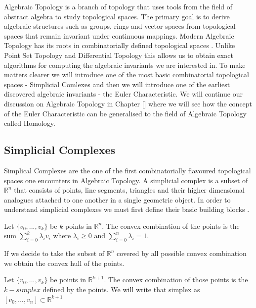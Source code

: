 Algebraic Topology is a branch of topology that uses tools from the field of abstract algebra to study topological spaces. The primary goal is to derive algebraic structures such as groups, rings and vector spaces from topological spaces that remain invariant under continuous mappings. Modern Algebraic Topology has its roots in combinatorially defined topological spaces \cite{comb-alg-topo}. Unlike Point Set Topology and Differential Topology this allows us to obtain exact algorithms for computing the algebraic invariants we are interested in. To make matters clearer we will introduce one of the most basic combinatorial topological spaces - Simplicial Comlexes and then we will introduce one of the earliest discovered algebraic invariants - the Euler Characteristic. We will continue our discussion on Algebraic Topology in Chapter [] where we will see how the concept of the Euler Characteristic can be generalised to the field of Algebraic Topology called Homology.

\subsection{Simplicial Complexes}

Simplical Complexes are the one of the first combinatorially flavoured topological spaces one encounters in Algebraic Topology. A simplicial complex is a subset of $\mathbb{R}^n$ that consists of points, line segments, triangles and their higher dimensional analogues attached to one another in a single geometric object. In order to understand simplicial complexes we must first define their basic building blocks \cite{comp-topo}.

\begin{defn} Let $\{v_0, ..., v_k\}$ be $k$ points in $\mathbb{R}^n$. The convex combination of the points is the sum $\sum_{i=0}^k{\lambda_iv_i}$ where $\lambda_i \ge 0$ and $\sum_{i=0}^n{\lambda_i} = 1$.  \end{defn}

If we decide to take the subset of $\mathbb{R}^n$ covered by all possible convex combination we obtain the convex hull of the points.

\begin{defn} Let $\{v_0, ..., v_k\}$ be points in $\mathbb{R}^{k+1}$. The convex combination of those points is the $k-simplex$ defined by the points. We will write that simplex as $[v_0, ..., v_n] \subset \mathbb{R}^{k+1}$  \end{defn}


